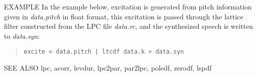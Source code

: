 \begin{options}
\end{options}

\begin{qsection}{EXAMPLE}
In the example below, excitation is generated from
pitch information given in {\em data.pitch} in float format,
this excitation is passed through the lattice filter
constructed from the LPC file {\em data.rc},
and the synthesized speech is written to {\em data.syn}:
\begin{quote}
 \verb!excite < data.pitch | ltcdf data.k > data.syn!
\end{quote} 
\end{qsection}

\begin{qsection}{SEE ALSO}
 lpc, acorr, levdur, lpc2par, par2lpc, poledf, zerodf, lspdf
\end{qsection}
